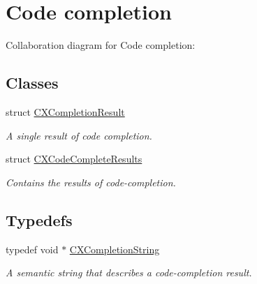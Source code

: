 \hypertarget{group__CINDEX__CODE__COMPLET}{}\section{Code completion}
\label{group__CINDEX__CODE__COMPLET}
Collaboration diagram for Code completion\+:
\subsection*{Classes}
\begin{DoxyCompactItemize}
\item 
struct \hyperlink{structCXCompletionResult}{C\+X\+Completion\+Result}
\begin{DoxyCompactList}\small\item\em A single result of code completion. \end{DoxyCompactList}\item 
struct \hyperlink{structCXCodeCompleteResults}{C\+X\+Code\+Complete\+Results}
\begin{DoxyCompactList}\small\item\em Contains the results of code-\/completion. \end{DoxyCompactList}\end{DoxyCompactItemize}
\subsection*{Typedefs}
\begin{DoxyCompactItemize}
\item 
typedef void $\ast$ \hyperlink{group__CINDEX__CODE__COMPLET_gafea23a43a60ec3b4f3bedccfbb76883a}{C\+X\+Completion\+String}
\begin{DoxyCompactList}\small\item\em A semantic string that describes a code-\/completion result. \end{DoxyCompactList}\end{DoxyCompactItemize}
